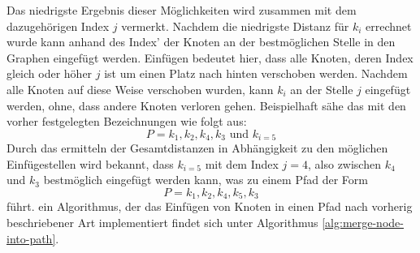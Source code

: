Das niedrigste Ergebnis dieser Möglichkeiten wird zusammen mit dem dazugehörigen Index $j$ vermerkt. 
Nachdem die niedrigste Distanz für $k_i$ errechnet wurde kann anhand des Index' der Knoten an der bestmöglichen Stelle in den Graphen eingefügt werden. 
Einfügen bedeutet hier, dass alle Knoten, deren Index gleich oder höher $j$ ist um einen Platz nach hinten verschoben werden. 
Nachdem alle Knoten auf diese Weise verschoben wurden, kann $k_i$ an der Stelle $j$ eingefügt werden, ohne, dass andere Knoten verloren gehen. 
Beispielhaft sähe das mit den vorher festgelegten Bezeichnungen wie folgt aus: 
$$P= k_1, k_2, k_4, k_3 \textrm{ und } k_{i = 5}$$ 
Durch das ermitteln der Gesamtdistanzen in Abhängigkeit zu den möglichen Einfügestellen wird bekannt, dass $k_{i=5}$ mit dem Index $j=4$, also zwischen $k_4$ und $k_3$ bestmöglich eingefügt werden kann, was zu einem Pfad der Form
$$P=k_1, k_2, k_4, k_5, k_3$$
führt.
ein Algorithmus, der das Einfügen von Knoten in einen Pfad nach vorherig beschriebener Art implementiert findet sich unter Algorithmus \vref{alg:merge-node-into-path}.

